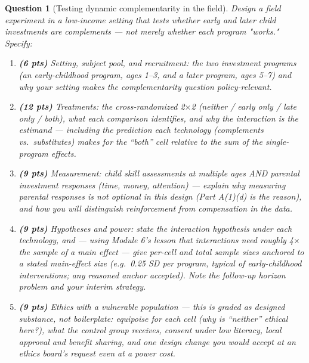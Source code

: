 \documentclass[11pt]{article}
\newtheorem{question}{Question}
\begin{document}
\begin{question}[Testing dynamic complementarity in the field]
Design a field experiment in a low-income setting that tests whether
early and later child investments are complements --- not merely whether
each program "works." Specify:
\begin{enumerate}[label=(\alph*)]
  \item \textbf{(6 pts)} Setting, subject pool, and recruitment: the
        two investment programs (an early-childhood program, ages 1--3,
        and a later program, ages 5--7) and why your setting makes the
        complementarity question policy-relevant.
  \item \textbf{(12 pts)} Treatments: the cross-randomized 2$\times$2
        (neither / early only / late only / both), what each comparison
        identifies, and why the \emph{interaction} is the estimand ---
        including the prediction each technology (complements vs.\
        substitutes) makes for the ``both'' cell relative to the sum of
        the single-program effects.
  \item \textbf{(9 pts)} Measurement: child skill assessments at
        multiple ages AND parental investment responses (time, money,
        attention) --- explain why measuring parental responses is not
        optional in this design (Part A(1)(d) is the reason), and how
        you will distinguish reinforcement from compensation in the
        data.
  \item \textbf{(9 pts)} Hypotheses and power: state the interaction
        hypothesis under each technology, and --- using Module 6's
        lesson that interactions need roughly 4$\times$ the sample of a
        main effect --- give per-cell and total sample sizes anchored to
        a stated main-effect size (e.g.\ 0.25 SD per program, typical
        of early-childhood interventions; any reasoned anchor
        accepted). Note the follow-up horizon problem and your interim
        strategy.
  \item \textbf{(9 pts)} Ethics with a vulnerable population --- this
        is graded as designed substance, not boilerplate: equipoise for
        each cell (why is ``neither'' ethical here?), what the control
        group receives, consent under low literacy, local approval and
        benefit sharing, and one design change you would accept at an
        ethics board's request even at a power cost.
\end{enumerate}
\end{question}
\end{document}
